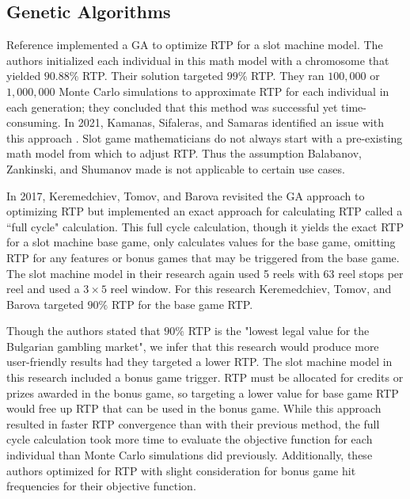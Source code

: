\documentclass[conference]{IEEEtran}
\begin{document}
\subsection{Genetic Algorithms}
Reference \cite{balabanov2015slot} implemented a GA to optimize RTP for a slot machine model.
The authors initialized each individual in this math model with a chromosome that yielded $90.88\%$ RTP.
Their solution targeted $99\%$ RTP.
They ran $100,000$ or $1,000,000$ Monte Carlo simulations to approximate RTP for each individual in each generation; they concluded that this method was successful yet time-consuming\cite{balabanov2015slot}.
In 2021, Kamanas, Sifaleras, and Samaras identified an issue with this approach \cite{kamanas2021slot}.
Slot game mathematicians do not always start with a pre-existing math model from which to adjust RTP.
Thus the assumption Balabanov, Zankinski, and Shumanov made is not applicable to certain use cases.
\par
In 2017, Keremedchiev, Tomov, and Barova revisited the GA approach to optimizing RTP but implemented an exact approach for calculating RTP called a ``full cycle" calculation\cite{keremedchiev2017slot}.
This full cycle calculation, though it yields the exact RTP for a slot machine base game, only calculates values for the base game, omitting RTP for any features or bonus games that may be triggered from the base game.
The slot machine model in their research again used 5 reels with 63 reel stops per reel and used a $3\times 5$ reel window.
For this research Keremedchiev, Tomov, and Barova targeted $90\%$ RTP for the base game RTP.
\par
Though the authors stated that $90\%$ RTP is the "lowest legal value for the Bulgarian gambling market"\cite{keremedchiev2017slot}, we infer that this research would produce more user-friendly results had they targeted a lower RTP.
The slot machine model in this research included a bonus game trigger.
RTP must be allocated for credits or prizes awarded in the bonus game, so targeting a lower value for base game RTP would free up RTP that can be used in the bonus game. 
While this approach resulted in faster RTP convergence than with their previous method, the full cycle calculation took more time to evaluate the objective function for each individual than Monte Carlo simulations did previously.
Additionally, these authors optimized for RTP with slight consideration for bonus game hit frequencies for their objective function.
\end{document}
